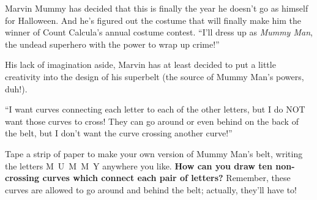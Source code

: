 

Marvin Mummy has decided that this is finally the year he doesn't go as
himself for Halloween. And he's figured out the costume that will
finally make him the winner of Count
Calcula's annual costume contest. ``I'll dress up as \textit{Mummy Man},
the undead superhero with the power to wrap up crime!''

His lack of imagination aside, Marvin has at least decided to put a little
creativity into the design of his superbelt
(the source of Mummy Man's powers, duh!).

\begin{center}
\end{center}

``I want curves
connecting each letter to each of the other letters, but I do NOT
want those curves to cross! They can go around or even behind on the back of the
belt, but I don't want the curve crossing another curve!''

Tape a strip of paper to make your own version of
Mummy Man's belt, writing the
letters M~U~M~M~Y anywhere you like. \textbf{How can you draw ten non-crossing
curves which connect each pair of letters?} Remember, these curves are allowed
to go around and behind the belt; actually, they'll have to!
